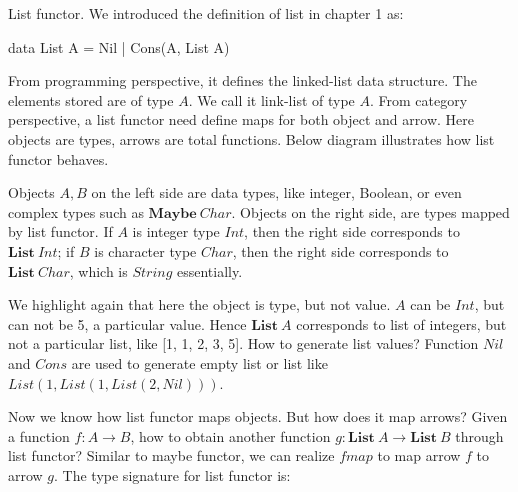 \documentclass[b5paper]{article}
\begin{document}
\begin{example}
\normalfont
{}
List functor. We introduced the definition of list in chapter 1 as:

\begin{Haskell}[frame=none]
data List A = Nil | Cons(A, List A)
\end{Haskell}

From programming perspective, it defines the linked-list data structure. The elements stored are of type $A$. We call it link-list of type $A$. From category perspective, a list functor need define maps for both object and arrow. Here objects are types, arrows are total functions. Below diagram illustrates how list functor behaves.

\begin{center}
\end{center}

Objects $A, B$ on the left side are data types, like integer, Boolean, or even complex types such as $\mathbf{Maybe}\ Char$. Objects on the right side, are types mapped by list functor. If $A$ is integer type $Int$, then the right side corresponds to $\mathbf{List}\ Int$; if $B$ is character type $Char$, then the right side corresponds to $\mathbf{List}\ Char$, which is $String$ essentially.

We highlight again that here the object is type, but not value. $A$ can be $Int$, but can not be 5, a particular value. Hence $\mathbf{List}\ A$ corresponds to list of integers, but not a particular list, like [1, 1, 2, 3, 5]. How to generate list values? Function $Nil$ and $Cons$ are used to generate empty list or list like $List(1, List(1, List(2, Nil)))$.

Now we know how list functor maps objects. But how does it map arrows? Given a function $f: A \to B$, how to obtain another function $g: \mathbf{List}\ A \to \mathbf{List}\ B$ through list functor? Similar to maybe functor, we can realize $fmap$ to map arrow $f$ to arrow $g$. The type signature for list functor is:


\end{example}
\end{document}
